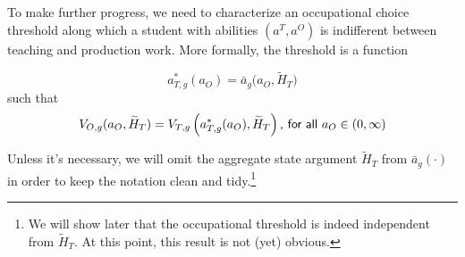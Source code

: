 \documentclass[onehalfspacing,11pt]{article}
\begin{document}
To make further progress, we need to characterize an occupational choice threshold along which a student with abilities $(a^T,a^O)$ is indifferent between teaching and production work. More formally, the threshold is a function

\begin{equation*}
a^*_{T,g}(a_O) = \bar{a}_g\big(a_{O},\widetilde{H}_T\big) %
\end{equation*}
such that
\begin{equation}
\label{eq:indiff}
V_{O,g}(a_{O},\widetilde{H}_T) = V_{T,g}\left(a^*_{T,g}(a_O),\widetilde{H}_T\right) \textrm{{\sf , for all} } a_O \in (0,\infty)
\end{equation}

Unless it's necessary, we will omit the aggregate state argument $\widetilde{H}_T$ from $\bar{a}_g(\cdot)$ in order to keep the notation clean and tidy.\footnote{We will show later that the occupational threshold is indeed independent from $\widetilde{H}_T$. At this point, this result is not (yet) obvious.}
\end{document}
